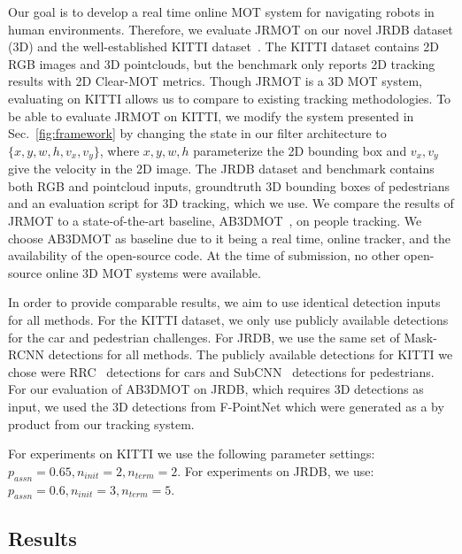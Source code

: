 \documentclass[letterpaper, 10 pt, conference]{ieeeconf}
\newcommand{\jrdb}{JRDB\xspace}
\newcommand{\methodname}{{JRMOT}\xspace}
\begin{document}
Our goal is to develop a real time online MOT system for navigating robots in human environments. Therefore, we evaluate \methodname on our novel \jrdb dataset (3D) and the well-established KITTI dataset~\cite{geiger2013vision}.
The KITTI dataset contains 2D RGB images and 3D pointclouds, but the benchmark only reports 2D tracking results with 2D Clear-MOT metrics. 
Though \methodname is a 3D MOT system, evaluating on KITTI allows us to compare to existing tracking methodologies.
To be able to evaluate \methodname on KITTI, we modify the system presented in Sec.~\ref{fig:framework} by changing the state in our filter architecture to $\{x,y,w,h,v_x,v_y\}$, 
where $x,y,w,h$ parameterize the 2D bounding box and $v_x, v_y$ give the velocity in the 2D image.
The \jrdb dataset and benchmark contains both RGB and pointcloud inputs, groundtruth 3D bounding boxes of pedestrians and an evaluation script for 3D tracking, which we use. We compare the results of \methodname to a state-of-the-art baseline, AB3DMOT~\cite{Weng2019_3dmot}, on people tracking. We choose AB3DMOT as baseline due to it being a real time, online tracker, and the availability of the open-source code. At the time of submission, no other open-source online 3D MOT systems were available.

In order to provide comparable results, we aim to use identical detection inputs for all methods. For the KITTI dataset, we only use publicly available detections for the car and pedestrian challenges. For \jrdb, we use the same set of  Mask-RCNN detections for all methods.
The publicly available detections for KITTI we chose were RRC~\cite{DBLP:journals/corr/RenCLSPYTX17} detections for cars and SubCNN~\cite{7926691} detections for pedestrians.
For our evaluation of AB3DMOT on \jrdb, which requires 3D detections as input, we used the 3D detections from F-PointNet which were generated as a by product from our tracking system.

For experiments on KITTI we use the following parameter settings: $p_{assn}=0.65,n_{init}=2,n_{term}=2$. For experiments on JRDB, we use: $p_{assn}=0.6,n_{init} = 3,n_{term}=5$.












\subsection*{Results}
\label{ss:res} 
\end{document}
